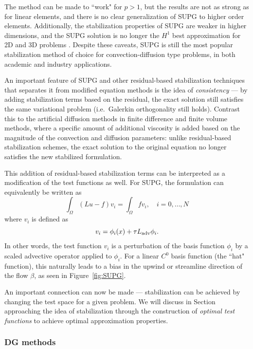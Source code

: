 The method can be made to ``work" for $p>1$, but the results are not as strong as for linear elements, and there is no clear generalization of SUPG to higher order elements.  Additionally, the stabilization properties of SUPG are weaker in higher dimensions, and the SUPG solution is no longer the $H^1$ best approximation for 2D and 3D problems .  Despite these caveats, SUPG is still the most popular stabilization method of choice for convection-diffusion type problems, in both academic and industry applications.  

An important feature of SUPG and other residual-based stabilization techniques that separates it from modified equation methods is the idea of \textit{consistency} --- by adding stabilization terms based on the residual, the exact solution still satisfies the same variational problem (i.e.\ Galerkin orthogonality still holds). Contrast this to the artificial diffusion methods in finite difference and finite volume methods, where a specific amount of additional viscosity is added based on the magnitude of the convection and diffusion parameters: unlike residual-based stabilization schemes, the exact solution to the original equation no longer satisfies the new stabilized formulation.  

This addition of residual-based stabilization terms can be interpreted as a modification of the test functions as well.  For SUPG, the formulation can equivalently be written as
\[
\int_\Omega\left( Lu-f\right) v_i = \int_\Omega f v_i, \quad i = 0,\ldots,N
\]
where $v_i$ is defined as
\[
v_i = \phi_i(x) + \tau L_{\rm adv} \phi_i.  
\]
In other words, the test function $v_i$ is a perturbation of the basis function $\phi_i$ by a scaled advective operator applied to $\phi_i$.  For a linear $C^0$ basis function (the ``hat" function), this naturally leads to a bias in the upwind or streamline direction of the flow $\beta$, as seen in Figure~\ref{fig:SUPG}.  

An important connection can now be made --- stabilization can be achieved by changing the test space for a given problem.  We will discuss in Section~ approaching the idea of stabilization through the construction of \textit{optimal test functions} to achieve optimal approximation properties. 

\subsubsection{DG methods}

